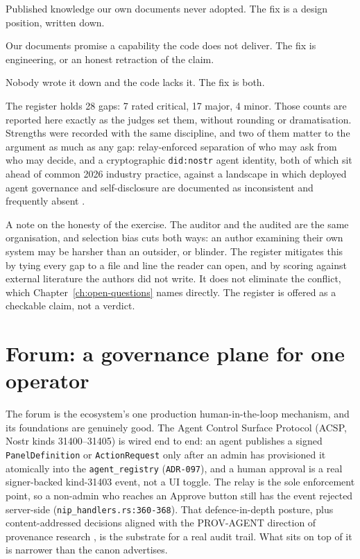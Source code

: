 \begin{definitionbox}[title={Three kinds of gap}]
\begin{description}[style=nextline, leftmargin=1.5em]
  \item[Theory-to-canon] Published knowledge our own documents never adopted. The fix is a design position, written down.
  \item[Canon-to-practice] Our documents promise a capability the code does not deliver. The fix is engineering, or an honest retraction of the claim.
  \item[Theory-to-practice] Nobody wrote it down and the code lacks it. The fix is both.
\end{description}
\end{definitionbox}

The register holds 28 gaps: 7 rated critical, 17 major, 4 minor. Those counts are reported here exactly as the judges set them, without rounding or dramatisation. Strengths were recorded with the same discipline, and two of them matter to the argument as much as any gap: relay-enforced separation of who may ask from who may decide, and a cryptographic \texttt{did:nostr} agent identity, both of which sit ahead of common 2026 industry practice, against a landscape in which deployed agent governance and self-disclosure are documented as inconsistent and frequently absent \parencite{AgentIndex2025}.

A note on the honesty of the exercise. The auditor and the audited are the same organisation, and selection bias cuts both ways: an author examining their own system may be harsher than an outsider, or blinder. The register mitigates this by tying every gap to a file and line the reader can open, and by scoring against external literature the authors did not write. It does not eliminate the conflict, which Chapter~\ref{ch:open-questions} names directly. The register is offered as a checkable claim, not a verdict.

\section{Forum: a governance plane for one operator}

The forum is the ecosystem's one production human-in-the-loop mechanism, and its foundations are genuinely good. The Agent Control Surface Protocol (ACSP, Nostr kinds 31400--31405) is wired end to end: an agent publishes a signed \texttt{PanelDefinition} or \texttt{ActionRequest} only after an admin has provisioned it atomically into the \texttt{agent\_registry} (\texttt{ADR-097}), and a human approval is a real signer-backed kind-31403 event, not a UI toggle. The relay is the sole enforcement point, so a non-admin who reaches an Approve button still has the event rejected server-side (\texttt{nip\_handlers.rs:360-368}). That defence-in-depth posture, plus content-addressed decisions aligned with the PROV-AGENT direction of provenance research \parencite{Souza2025ProvAgent}, is the substrate for a real audit trail. What sits on top of it is narrower than the canon advertises.

